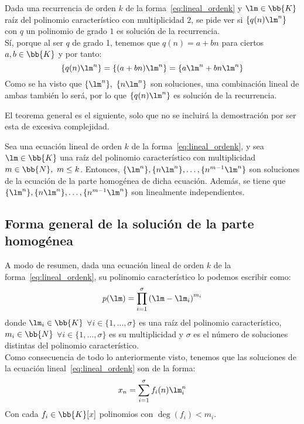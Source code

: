 \begin{ejercicio*}
    Dada una recurrencia de orden $k$ de la forma~\ref{eq:lineal_ordenk} y $\lm\in \bb{K}$ raíz del polinomio característico con multiplicidad $2$, se pide ver si $\{q(n)\lm^n\}$ con $q$ un polinomio de grado $1$ es solución de la recurrencia.\\

    Sí, porque al ser $q$ de grado 1, tenemos que $q(n)=a+bn$ para ciertos $a,b\in \bb{K}$ y por tanto:
    \begin{equation*}
        \{q(n)\lm^n\}=\{(a+bn)\lm^n\}
        = \{a\lm^n + bn\lm^n\}
    \end{equation*}
    Como se ha visto que $\{\lm^n\},~\{n\lm^n\}$ son soluciones, una combinación lineal de ambas también lo será, por lo que $\{q(n)\lm^n\}$ es solución de la recurrencia.
\end{ejercicio*}

El teorema general es el siguiente, solo que no se incluirá la demostración por ser esta de excesiva complejidad.
\begin{teo}\label{teo:soluciones_multiplicidad_multiple}
    Sea una ecuación lineal de orden $k$ de la forma~\ref{eq:lineal_ordenk}, y sea $\lm\in \bb{K}$ una raíz del polinomio característico con multiplicidad $m\in \bb{N},~m\leq k$. Entonces, $\{\lm^n\}, \{n\lm^n\}, \dots, \{n^{m-1}\lm^n\}$ son soluciones de la ecuación de la parte homogénea de dicha ecuación.
    Además, se tiene que $\{\lm^n\}, \{n\lm^n\}, \dots, \{n^{m-1}\lm^n\}$ son linealmente independientes.
\end{teo}

\subsection{Forma general de la solución de la parte homogénea}


A modo de resumen, dada una ecuación lineal de orden $k$ de la forma~\ref{eq:lineal_ordenk}, su polinomio característico lo podemos escribir como:
\begin{equation*}
    p(\lm) = \prod_{i=1}^\sigma {(\lm - \lm_i)}^{m_i}
\end{equation*}
donde $\lm_i\in \bb{K}$ $\forall i \in \{1, \ldots, \sigma\}$ es una raíz del polinomio característico, $m_i\in \bb{N}$ $\forall i \in \{1, \ldots, \sigma\}$ es su multiplicidad y $\sigma$ es el número de soluciones distintas del polinomio característico.\\

Como consecuencia de todo lo anteriormente visto, tenemos que las soluciones de la ecuación lineal~\ref{eq:lineal_ordenk} son de la forma:
\begin{equation*}
    x_n = \sum_{i=1}^\sigma f_i(n) \lm_i^n
\end{equation*}
Con cada $f_i\in \bb{K}[x]$ polinomios con $\deg(f_i)< m_i$.

